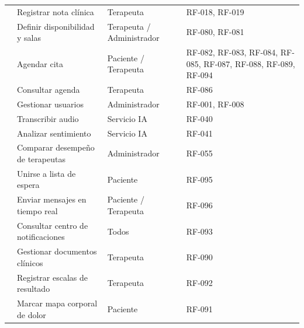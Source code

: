 \begin{longtable}{L{1.6cm} L{5cm} L{3.5cm} L{4cm}}
   & Registrar nota clínica & Terapeuta & RF-018, RF-019 \\
   & Definir disponibilidad y salas & Terapeuta / Administrador & RF-080, RF-081 \\
   & Agendar cita & Paciente / Terapeuta & RF-082, RF-083, RF-084, RF-085, RF-087, RF-088, RF-089, RF-094 \\
   & Consultar agenda & Terapeuta & RF-086 \\
   & Gestionar usuarios & Administrador & RF-001, RF-008 \\
   & Transcribir audio & Servicio IA & RF-040 \\
   & Analizar sentimiento & Servicio IA & RF-041 \\
   & Comparar desempeño de terapeutas & Administrador & RF-055 \\
   & Unirse a lista de espera & Paciente & RF-095 \\
   & Enviar mensajes en tiempo real & Paciente / Terapeuta & RF-096 \\
   & Consultar centro de notificaciones & Todos & RF-093 \\
   & Gestionar documentos clínicos & Terapeuta & RF-090 \\
   & Registrar escalas de resultado & Terapeuta & RF-092 \\
   & Marcar mapa corporal de dolor & Paciente & RF-091 \\
  \bottomrule
\end{longtable}